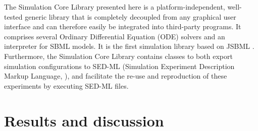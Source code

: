 \documentclass[10pt]{bmc_article}
\newenvironment{bmcformat}{\baselineskip20pt\sloppy\setboolean{publ}{false}}{\baselineskip20pt\sloppy}
\begin{document}
\begin{bmcformat}
%
%
%
%
The Simulation Core Library presented here is a platform-independent,
well-tested generic library that is completely decoupled from any graphical
user interface and can therefore easily be integrated into third-party programs.
It comprises several Ordinary Differential Equation (ODE)
solvers and an interpreter for SBML models. It is the first simulation library
based on JSBML \cite{Draeger2011b}. 
%
%
Furthermore, the Simulation Core Library contains classes to both export
simulation configurations to SED-ML (Simulation Experiment Description Markup Language,
\cite{Waltemath2011}), and facilitate the re-use and reproduction of these
experiments by executing SED-ML files.

\section*{Results and discussion}


\end{bmcformat}
\end{document}
